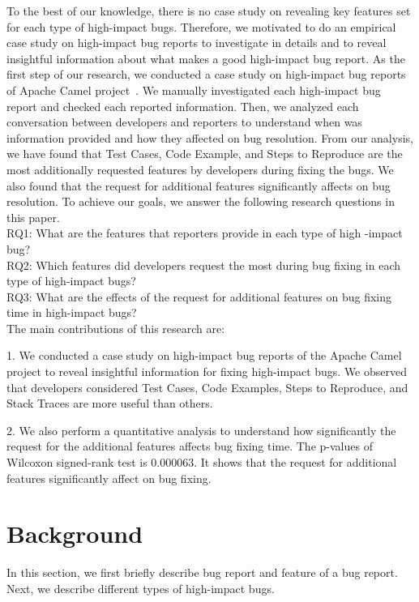 \documentclass[conference]{IEEEtran}
\begin{document}
To the best of our knowledge, there is no case study on revealing key features set for each type of high-impact bugs. Therefore, we motivated to do an empirical case study on high-impact bug reports to investigate in details and to reveal insightful information about what makes a good high-impact bug report. As the first step of our research, we conducted a case study on high-impact bug reports of Apache Camel project~\cite{Ohira:2015}. We manually investigated each high-impact bug report and checked each reported information. Then, we analyzed each conversation between developers and reporters to understand when was information provided and how they affected on bug resolution. From our analysis, we have found that Test Cases, Code Example, and Steps to Reproduce are the most additionally requested features by developers during fixing the bugs. We also found that the request for additional features significantly affects on bug resolution. To achieve our goals, we answer the following research questions in this paper.\\ 
  
RQ1: What are the features that reporters provide in each type of high \hangindent=1.2cm -impact bug?\\

RQ2: Which features did developers request the most during  \hangindent=1.2cm bug fixing in each type of high-impact bugs?\\

RQ3: What are the effects of the request for additional features on bug  \hangindent=1.2cm fixing time in high-impact bugs?\\

The main contributions of this research are:

1.	We conducted  a case study on high-impact bug reports of the Apache Camel project to reveal insightful information for fixing high-impact bugs. We observed that developers considered Test Cases, Code Examples, Steps to Reproduce, and Stack Traces are more useful than others.

2. We also perform a quantitative analysis to understand how significantly the request for the additional features affects bug fixing time. The p-values of Wilcoxon signed-rank test is 0.000063. It shows that the request for additional features significantly affect on bug fixing.

\section{Background}
In this section, we first briefly describe bug report and feature of a bug report. Next, we describe different types of high-impact bugs.
\end{document}
